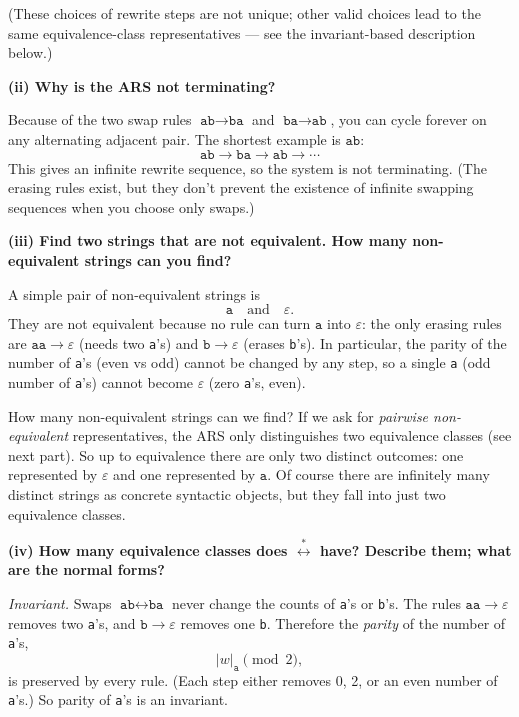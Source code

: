 \documentclass[12pt]{article}
\begin{document}
(These choices of rewrite steps are not unique; other valid choices lead to the same equivalence-class representatives — see the invariant-based description below.)

\bigskip

\textbf{(ii) Why is the ARS not terminating?}

Because of the two swap rules \(\texttt{ab}\to\texttt{ba}\) and \(\texttt{ba}\to\texttt{ab}\), you can cycle forever on any alternating adjacent pair. The shortest example is \(\texttt{ab}\):
\[
\texttt{ab}\longrightarrow\texttt{ba}\longrightarrow\texttt{ab}\longrightarrow\cdots
\]
This gives an infinite rewrite sequence, so the system is not terminating. (The erasing rules exist, but they don't prevent the existence of infinite swapping sequences when you choose only swaps.)

\bigskip

\textbf{(iii) Find two strings that are not equivalent. How many non-equivalent strings can you find?}

A simple pair of non-equivalent strings is
\[
\texttt{a}\quad\text{and}\quad\varepsilon.
\]
They are not equivalent because no rule can turn \(\texttt{a}\) into \(\varepsilon\): the only erasing rules are \(\texttt{aa}\to\varepsilon\) (needs two \texttt{a}'s) and \(\texttt{b}\to\varepsilon\) (erases \texttt{b}'s). In particular, the parity of the number of \texttt{a}'s (even vs odd) cannot be changed by any step, so a single \texttt{a} (odd number of \texttt{a}'s) cannot become \(\varepsilon\) (zero \texttt{a}'s, even).

How many non-equivalent strings can we find? If we ask for \emph{pairwise non-equivalent} representatives, the ARS only distinguishes two equivalence classes (see next part). So up to equivalence there are only two distinct outcomes: one represented by \(\varepsilon\) and one represented by \(\texttt{a}\). Of course there are infinitely many distinct strings as concrete syntactic objects, but they fall into just two equivalence classes.

\bigskip

\textbf{(iv) How many equivalence classes does \(\stackrel{*}{\longleftrightarrow}\) have? Describe them; what are the normal forms?}

\emph{Invariant.} Swaps \(\texttt{ab}\leftrightarrow\texttt{ba}\) never change the counts of \texttt{a}'s or \texttt{b}'s. The rules \(\texttt{aa}\to\varepsilon\) removes two \texttt{a}'s, and \(\texttt{b}\to\varepsilon\) removes one \texttt{b}. Therefore the \emph{parity} of the number of \texttt{a}'s,
\[
|w|_{\texttt{a}}\pmod{2},
\]
is preserved by every rule. (Each step either removes 0, 2, or an even number of \texttt{a}'s.) So parity of \texttt{a}'s is an invariant.
\end{document}
